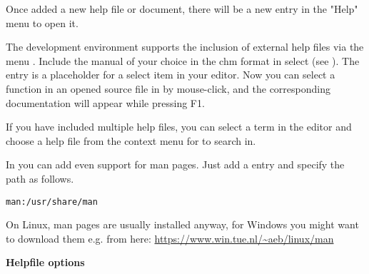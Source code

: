 Once added a new help file or document, there will be a new entry in the "Help" menu to open it.
 
The \codeblocks development environment supports the inclusion of external help files via the menu . Include the manual of your choice in the chm format in  select  (see ). The entry  is a placeholder for a select item in your editor. Now you can select a function in an opened source file in \codeblocks by mouse-click, and the corresponding documentation will appear while pressing F1.

If you have included multiple help files, you can select a term in the editor and choose a help file from the context menu  for \codeblocks to search in.


In \codeblocks you can add even support for man pages. Just add a entry  and specify the path as follows.

\begin{lstlisting}
man:/usr/share/man
\end{lstlisting}

On Linux, man pages are usually installed anyway, for Windows you might want to download them e.g. from here: \url{https://www.win.tue.nl/~aeb/linux/man}

\textbf{Helpfile options}

